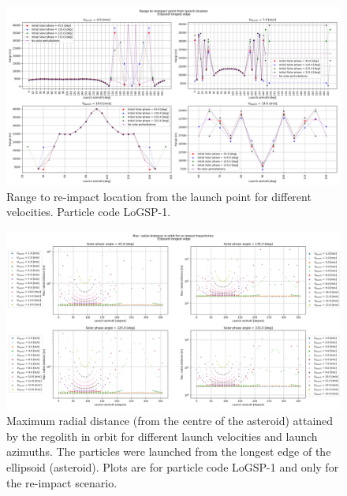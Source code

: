 \documentclass[print]{tudelft-report}
\begin{document}
\begin{appendices}
    \FloatBarrier
    \begin{figure}[htb]
    \centering
    \captionsetup{justification=centering}
    \includegraphics[angle=90, width=\textwidth, height=\textheight, keepaspectratio=true]{Results/Images/longest_edge_perturbations/3.2Density_1cmSize/reimpactRangeComparison.png}
    \caption{Range to re-impact location from the launch point for different velocities. Particle code LoGSP-1.}
    \label{fig:LoGSP_1_range_comparison}
    \end{figure}
    \FloatBarrier
    \begin{figure}[htb]
    \centering
    \captionsetup{justification=centering}
    \includegraphics[angle=90, width=\textwidth, height=\textheight, keepaspectratio=true]{Results/Images/longest_edge_perturbations/3.2Density_1cmSize/maxAltitude_reimpactCase.png}
    \caption{Maximum radial distance (from the centre of the asteroid) attained by the regolith in orbit for different launch velocities and launch azimuths. The particles were launched from the longest edge of the ellipsoid (asteroid). Plots are for particle code LoGSP-1 and only for the re-impact scenario.}

\end{figure}
\end{appendices}
\end{document}
